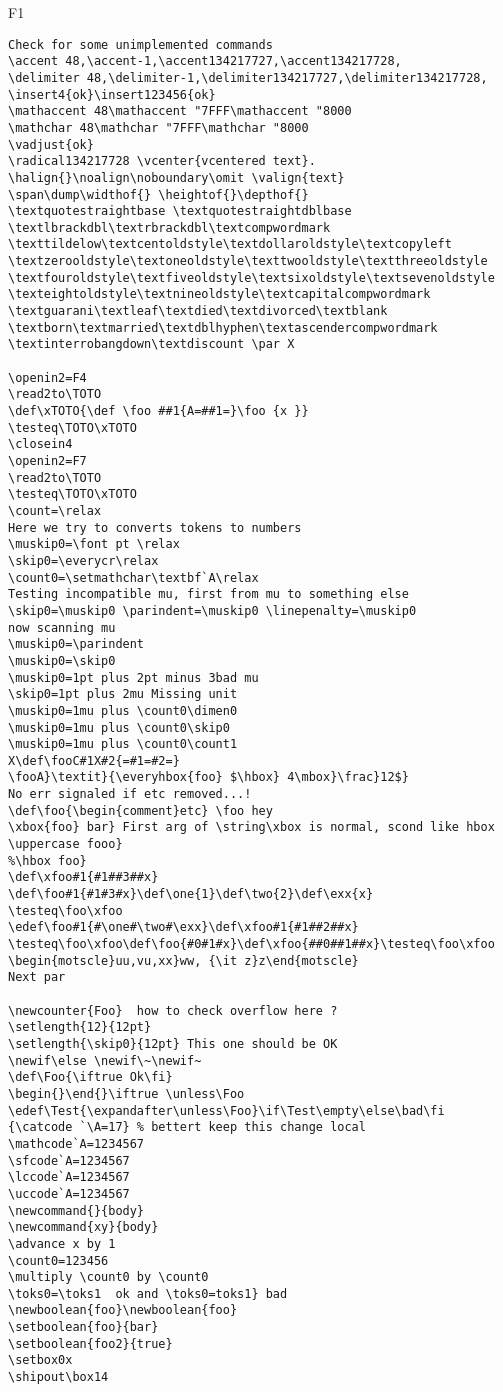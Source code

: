 \documentclass{article}
\begin{document}
\begin{filecontents+}{F1}
\begin{Verbatim}
Check for some unimplemented commands
\accent 48,\accent-1,\accent134217727,\accent134217728, 
\delimiter 48,\delimiter-1,\delimiter134217727,\delimiter134217728, 
\insert4{ok}\insert123456{ok}
\mathaccent 48\mathaccent "7FFF\mathaccent "8000
\mathchar 48\mathchar "7FFF\mathchar "8000
\vadjust{ok}
\radical134217728 \vcenter{vcentered text}.
\halign{}\noalign\noboundary\omit \valign{text}
\span\dump\widthof{} \heightof{}\depthof{}
\textquotestraightbase \textquotestraightdblbase
\textlbrackdbl\textrbrackdbl\textcompwordmark
\texttildelow\textcentoldstyle\textdollaroldstyle\textcopyleft
\textzerooldstyle\textoneoldstyle\texttwooldstyle\textthreeoldstyle
\textfouroldstyle\textfiveoldstyle\textsixoldstyle\textsevenoldstyle
\texteightoldstyle\textnineoldstyle\textcapitalcompwordmark
\textguarani\textleaf\textdied\textdivorced\textblank
\textborn\textmarried\textdblhyphen\textascendercompwordmark
\textinterrobangdown\textdiscount \par X
 
\openin2=F4
\read2to\TOTO
\def\xTOTO{\def \foo ##1{A=##1=}\foo {x }}
\testeq\TOTO\xTOTO
\closein4
\openin2=F7
\read2to\TOTO
\testeq\TOTO\xTOTO
\count=\relax
Here we try to converts tokens to numbers
\muskip0=\font pt \relax
\skip0=\everycr\relax 
\count0=\setmathchar\textbf`A\relax
Testing incompatible mu, first from mu to something else
\skip0=\muskip0 \parindent=\muskip0 \linepenalty=\muskip0
now scanning mu
\muskip0=\parindent 
\muskip0=\skip0 
\muskip0=1pt plus 2pt minus 3bad mu
\skip0=1pt plus 2mu Missing unit
\muskip0=1mu plus \count0\dimen0
\muskip0=1mu plus \count0\skip0
\muskip0=1mu plus \count0\count1
X\def\fooC#1X#2{=#1=#2=}
\fooA}\textit}{\everyhbox{foo} $\hbox} 4\mbox}\frac}12$}
No err signaled if etc removed...!
\def\foo{\begin{comment}etc} \foo hey
\xbox{foo} bar} First arg of \string\xbox is normal, scond like hbox 
\uppercase fooo}
%\hbox foo}
\def\xfoo#1{#1##3##x}
\def\foo#1{#1#3#x}\def\one{1}\def\two{2}\def\exx{x}
\testeq\foo\xfoo
\edef\foo#1{#\one#\two#\exx}\def\xfoo#1{#1##2##x}
\testeq\foo\xfoo\def\foo{#0#1#x}\def\xfoo{##0##1##x}\testeq\foo\xfoo
\begin{motscle}uu,vu,xx}ww, {\it z}z\end{motscle}
Next par

\newcounter{Foo}  how to check overflow here ?
\setlength{12}{12pt}
\setlength{\skip0}{12pt} This one should be OK
\newif\else \newif\~\newif~
\def\Foo{\iftrue Ok\fi}
\begin{}\end{}\iftrue \unless\Foo
\edef\Test{\expandafter\unless\Foo}\if\Test\empty\else\bad\fi
{\catcode `\A=17} % bettert keep this change local
\mathcode`A=1234567
\sfcode`A=1234567
\lccode`A=1234567
\uccode`A=1234567
\newcommand{}{body}
\newcommand{xy}{body}
\advance x by 1
\count0=123456
\multiply \count0 by \count0
\toks0=\toks1  ok and \toks0=toks1} bad
\newboolean{foo}\newboolean{foo}
\setboolean{foo}{bar}
\setboolean{foo2}{true}
\setbox0x
\shipout\box14


\end{Verbatim}
\end{filecontents+}
\end{document}
